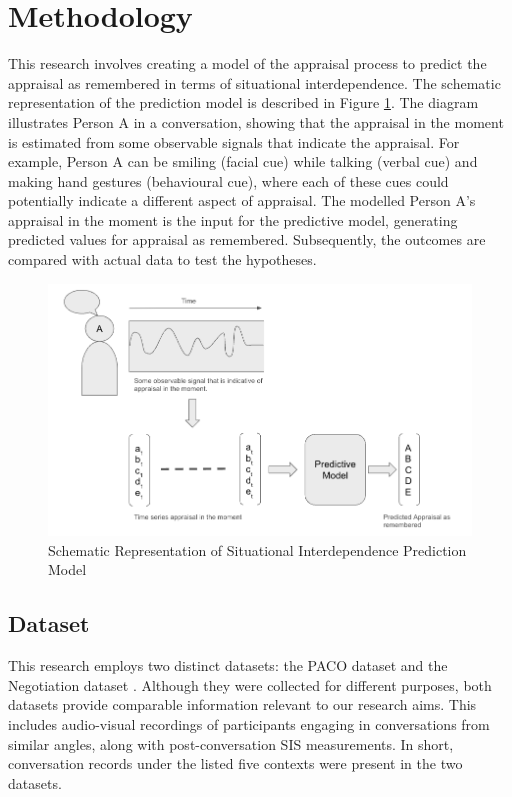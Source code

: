\section{Methodology}
This research involves creating a model of the appraisal process to predict the appraisal as remembered in terms of situational interdependence. The schematic representation of the prediction model is described in Figure \ref{fig:model_diagram}. The diagram illustrates Person A in a conversation, showing that the appraisal in the moment is estimated from some observable signals that indicate the appraisal. For example, Person A can be smiling (facial cue) while talking (verbal cue) and making hand gestures (behavioural cue), where each of these cues could potentially indicate a different aspect of appraisal. The modelled Person A's appraisal in the moment is the input for the predictive model, generating predicted values for appraisal as remembered. Subsequently, the outcomes are compared with actual data to test the hypotheses.
\begin{figure}
    \centering
    \includegraphics[width=\linewidth]{Images/schematic1.png}
    \caption{Schematic Representation of Situational Interdependence Prediction Model}
    \label{fig:model_diagram}
\end{figure}

\subsection{Dataset}
This research employs two distinct datasets: the PACO dataset \cite{matej2022designing} and the Negotiation dataset \cite{recorgnizing2021Dudzik}. Although they were collected for different purposes, both datasets provide comparable information relevant to our research aims. This includes audio-visual recordings of participants engaging in conversations from similar angles, along with post-conversation SIS measurements. In short, conversation records under the listed five contexts were present in the two datasets.

